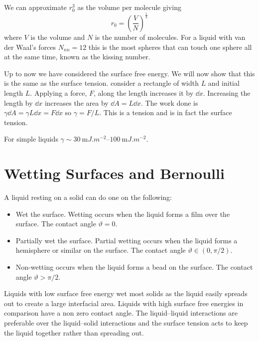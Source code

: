 \documentclass{article}
\begin{document}
    We can approximate \(r_0^3\)  as the volume per molecule giving
    \[r_0 = \left(\frac{V}{N}\right)^{\frac{1}{3}}\]
    where \(V\) is the volume and \(N\) is the number of molecules.
    For a liquid with van der Waal's forces \(N_{nn} = 12\) this is the most spheres that can touch one sphere all at the same time, known as the kissing number.
    
    Up to now we have considered the surface free energy.
    We will now show that this is the same as the surface tension.
    consider a rectangle of width \(L\) and initial length \(L\).
    Applying a force, \(F\), along the length increases it by \(\dd x\).
    Increasing the length by \(\dd x\) increases the area by \(\dd A = L\dd x\).
    The work done is \(\gamma\dd A = \gamma L \dd x = F\dd x\) so \(\gamma = F/L\).
    This is a tension and is in fact the surface tension.
    
    For simple liquids \(\gamma\sim \SIrange[range-phrase=-]{30}{100}{\milli J.m^{-2}}\).
    
    \section{Wetting Surfaces and Bernoulli}
    A liquid resting on a solid can do one on the following:
    \begin{itemize}
        \item Wet the surface.
        Wetting occurs when the liquid forms a film over the surface.
        The contact angle \(\vartheta = 0\).
        \item Partially wet the surface.
        Partial wetting occurs when the liquid forms a hemisphere or similar on the surface.
        The contact angle \(\vartheta\in(0, \pi/2)\).
        \item Non-wetting occurs when the liquid forms a bead on the surface.
        The contact angle \(\vartheta > \pi/2\).
    \end{itemize}
    Liquids with low surface free energy wet most solids as the liquid easily spreads out to create a large interfacial area.
    Liquids with high surface free energies in comparison have a non zero contact angle.
    The liquid--liquid interactions are preferable over the liquid--solid interactions and the surface tension acts to keep the liquid together rather than spreading out.
    
\end{document}
